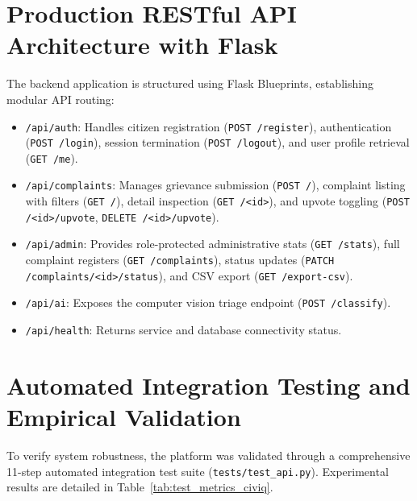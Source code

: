 \documentclass[12pt,a4paper]{report}
\begin{document}
\section{Production RESTful API Architecture with Flask}
The backend application is structured using Flask Blueprints, establishing modular API routing:
\begin{itemize}
    \item \texttt{/api/auth}: Handles citizen registration (\texttt{POST /register}), authentication (\texttt{POST /login}), session termination (\texttt{POST /logout}), and user profile retrieval (\texttt{GET /me}).
    \item \texttt{/api/complaints}: Manages grievance submission (\texttt{POST /}), complaint listing with filters (\texttt{GET /}), detail inspection (\texttt{GET /<id>}), and upvote toggling (\texttt{POST /<id>/upvote}, \texttt{DELETE /<id>/upvote}).
    \item \texttt{/api/admin}: Provides role-protected administrative stats (\texttt{GET /stats}), full complaint registers (\texttt{GET /complaints}), status updates (\texttt{PATCH /complaints/<id>/status}), and CSV export (\texttt{GET /export-csv}).
    \item \texttt{/api/ai}: Exposes the computer vision triage endpoint (\texttt{POST /classify}).
    \item \texttt{/api/health}: Returns service and database connectivity status.
\end{itemize}

\section{Automated Integration Testing and Empirical Validation}
To verify system robustness, the platform was validated through a comprehensive 11-step automated integration test suite (\texttt{tests/test\_api.py}). Experimental results are detailed in Table~\ref{tab:test_metrics_civiq}.
\end{document}
